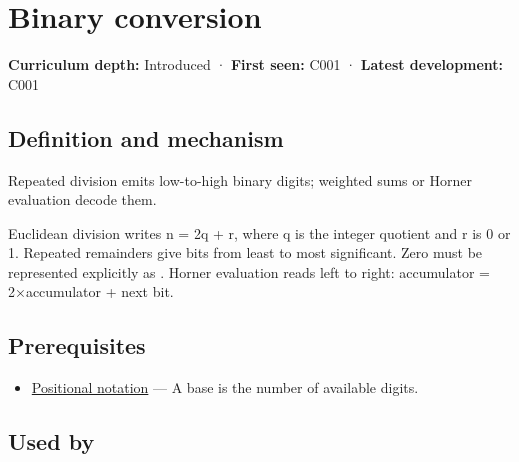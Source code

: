 \hypertarget{appendix-dc552784a2c0}{}\label{referencestart:appendix-dc552784a2c0}
\section{Binary conversion}\label{appendix-dc552784a2c0-binary-conversion}

\hypertarget{appendix-dc552784a2c0-binary-conversion}{}

\textbf{Curriculum depth:} Introduced · \textbf{First seen:} C001 · \textbf{Latest development:} C001

\begin{allmightroledefinition}

\subsection{Definition and mechanism}\label{appendix-dc552784a2c0-definition-and-mechanism}

\hypertarget{appendix-dc552784a2c0-definition-and-mechanism}{}

Repeated division emits low-to-high binary digits; weighted sums or Horner evaluation decode them.

\end{allmightroledefinition}

Euclidean division writes n = 2q + r, where q is the integer quotient and r is 0 or 1. Repeated remainders give bits from least to most significant. Zero must be represented explicitly as . Horner evaluation reads left to right: accumulator = 2×accumulator + next bit.

\subsection{Prerequisites}\label{appendix-dc552784a2c0-prerequisites}

\hypertarget{appendix-dc552784a2c0-prerequisites}{}

\begin{itemize}
\tightlist
\item
  \hyperref[appendix-83c3f28f7bda]{Positional notation} --- A base is the number of available digits.
\end{itemize}

\subsection{Used by}\label{appendix-dc552784a2c0-used-by}

